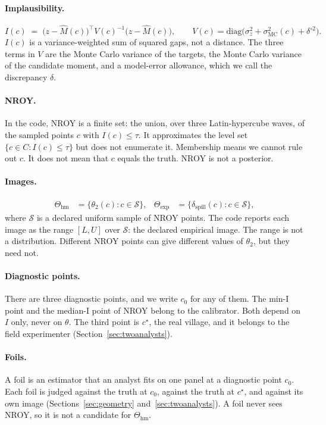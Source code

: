 \documentclass[11pt]{article}
\newcommand{\hm}{\mathrm{hm}}
\newcommand{\expset}{\mathrm{exp}}
\newcommand{\dspill}{\delta_{\mathrm{spill}}}
\begin{document}
\paragraph{Implausibility.}
\begin{equation}
  I(c)
  \;=\;
  \bigl(z-\widehat M(c)\bigr)^{\!\top}
  V(c)^{-1}
  \bigl(z-\widehat M(c)\bigr),
  \qquad
  V(c)=\mathrm{diag}\bigl(\sigma^2_z+\sigma^2_{\mathrm{MC}}(c)+\delta^{\circ 2}\bigr).
\end{equation}
$I(c)$ is a variance-weighted sum of squared gaps, not a distance. The
three terms in $V$ are the Monte Carlo variance of the targets, the
Monte Carlo variance of the candidate moment, and a model-error
allowance, which we call the discrepancy $\delta$.

\paragraph{NROY.}
In the code, NROY is a finite set: the union, over three Latin-hypercube
waves, of the sampled points $c$ with $I(c)\le\tau$. It approximates
the level set $\{c\in C:I(c)\le\tau\}$ but does not enumerate it.
Membership means we cannot rule out $c$. It does not mean that $c$ equals the truth. NROY is not a
posterior.

\paragraph{Images.}
\begin{align}
  \Theta_{\hm}
  &= \{\theta_2(c):c\in\mathcal S\},
  &
  \Theta_{\expset}
  &= \{\dspill(c):c\in\mathcal S\},
\end{align}
where $\mathcal S$ is a declared uniform sample of \ThetaSample{} NROY points. The
code reports each image as the range $[L,U]$ over $\mathcal S$: the
declared empirical image. The range is not a distribution. Different NROY
points can give different values of $\theta_2$, but they need not.

\paragraph{Diagnostic points.}
There are three diagnostic points, and we write $c_0$ for any of them.
The min-I point and the median-I point of NROY belong to the calibrator.
Both depend on $I$ only, never on $\theta$. The third point is
$c^\star$, the real village, and it belongs to the field experimenter
(Section~\ref{sec:twoanalysts}).

\paragraph{Foils.}
A foil is an estimator that an analyst fits on one panel at a diagnostic point
$c_0$. Each foil is judged against the truth at $c_0$, against the truth at $c^\star$,
and against its own image (Sections~\ref{sec:geometry} and~\ref{sec:twoanalysts}). A foil never sees NROY, so it is not a
candidate for $\Theta_{\hm}$.
\end{document}
